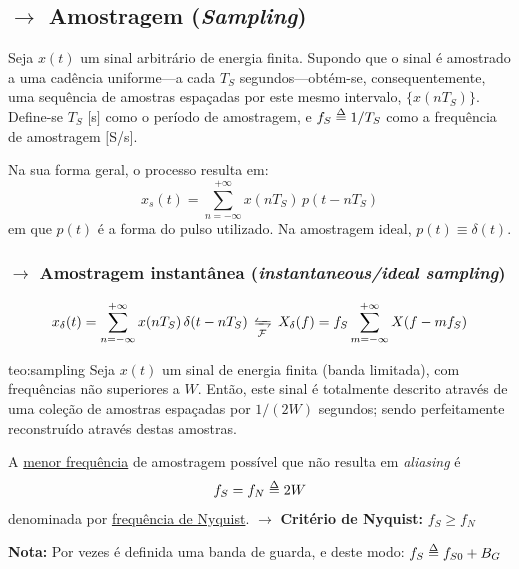 \subsection[3.1 Amostragem (\textit{Sampling})]{$\rightarrow$ Amostragem (\textit{Sampling})}
\label{subsec:sampling}

Seja $x(t)$ um sinal arbitrário de energia finita. Supondo que o sinal é amostrado a uma cadência uniforme---a cada $T_S$ segundos---obtém-se, consequentemente, uma sequência de amostras espaçadas por este mesmo intervalo, $\{x(nT_S)\}$. Define-se $T_S$ $[$s$]$ como o período de amostragem, e $f_S \delequal 1/T_S$ como a frequência de amostragem $[$S/s$]$.

\vspace{0.75em}
\noindent Na sua forma geral, o processo resulta em:
$$
    \boxed{ x_s(t) = \sum_{n=-\infty}^{+\infty} x(nT_S)\, p(t-nT_S) }
$$
em que $p(t)$ é a forma do pulso utilizado. Na amostragem ideal, $p(t) \equiv \delta(t)$.

\subsubsection[3.1.1 Amostragem instantânea]{$\rightarrow$ Amostragem instantânea (\textit{instantaneous/ideal sampling})}
\label{subsubsec:instantaneous-sampling}
$$
    x_{\delta}(t) = \sum_{n=-\infty}^{+\infty} x(nT_S)\, \delta(t-nT_S) \,\xleftrightharpoons[\mathcal{F}]{}\, X_{\delta}(f) = f_S \sum_{m=-\infty}^{+\infty} X(f-m f_S)
$$

\vspace{-1em}
\begin{theo}{teo:sampling}\label{teo:sampling}
    Seja $x(t)$ um sinal de energia finita (banda limitada), com frequências não superiores a $W$. Então, este sinal é totalmente descrito através de uma coleção de amostras espaçadas por $1/(2W)$ segundos; sendo perfeitamente reconstruído através destas amostras.

    \vspace{0.5em}
    \noindent A \underline{menor frequência} de amostragem possível que não resulta em \textit{aliasing} é
    $$
        f_S = f_N \delequal 2W
    $$
    denominada por \underline{frequência de Nyquist}. $\pmb{\rightarrow}$ \textbf{Critério de Nyquist:} $f_S \geq f_N$ 

    \vspace{0.75em}
    \noindent \textbf{Nota:} Por vezes é definida uma banda de guarda, e deste modo: $f_S \delequal f_{S0} + B_G$
\end{theo}

